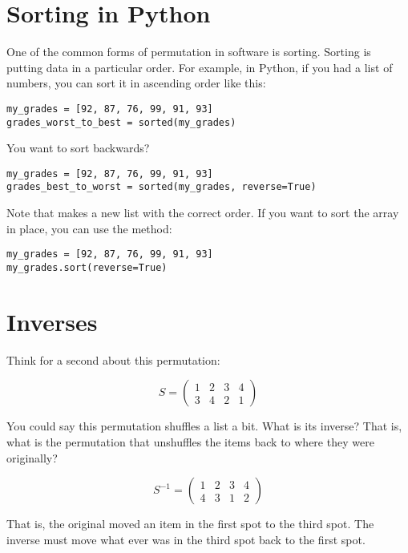 \section{Sorting in Python}

One of the common forms of permutation in software is sorting.
Sorting is putting data in a particular order. For example, in Python,
if you had a list of numbers, you can sort it in ascending order like
this:

\begin{Verbatim}
my_grades = [92, 87, 76, 99, 91, 93]
grades_worst_to_best = sorted(my_grades)
\end{Verbatim}

You want to sort backwards?

\begin{Verbatim}
my_grades = [92, 87, 76, 99, 91, 93]
grades_best_to_worst = sorted(my_grades, reverse=True)
\end{Verbatim}

Note that  makes a new list with the correct
order. If you want to sort the array in place, you can use the
 method:

\begin{Verbatim}
my_grades = [92, 87, 76, 99, 91, 93]
my_grades.sort(reverse=True)
\end{Verbatim}

\section{Inverses}

Think for a second about this permutation:

$$S = \begin{pmatrix}
  1 & 2 & 3 & 4 \\
  3 & 4 & 2 & 1
\end{pmatrix}$$

You could say this permutation shuffles a list a bit.  What is its
inverse? That is, what is the permutation that unshuffles the items
back to where they were originally?

$$S^{-1} = \begin{pmatrix}
  1 & 2 & 3 & 4 \\
  4 & 3 & 1 & 2
\end{pmatrix}$$

That is, the original moved an item in the first spot to the third
spot. The inverse must move what ever was in the third spot back to
the first spot.

